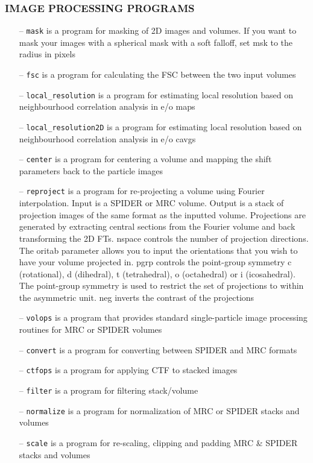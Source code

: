 \documentclass[a4paper,11pt]{article}
\newcommand{\prgname}[1]{\textcolor{NavyBlue}{\texttt{#1}}}
\begin{document}
\subsubsection{IMAGE PROCESSING PROGRAMS}
\begin{itemize}
\item[--] \prgname{mask} is a program for masking of 2D images and volumes. If you want to mask your images with a spherical mask with a soft  falloff, set msk to the radius in pixels
\item[--] \prgname{fsc} is a program for calculating the FSC between the two input volumes
\item[--] \prgname{local\_resolution} is a program for estimating local resolution based on neighbourhood correlation analysis in e/o maps
\item[--] \prgname{local\_resolution2D} is a program for estimating local resolution based on neighbourhood correlation analysis in e/o cavgs
\item[--] \prgname{center} is a program for centering a volume and mapping the shift parameters back to the particle images
\item[--] \prgname{reproject} is a program for re-projecting a volume using Fourier interpolation. Input is a SPIDER or MRC volume. Output is a stack of projection images of the same format as the inputted volume. Projections are generated by extracting central sections from the Fourier volume and back transforming the 2D FTs. nspace controls the number of projection directions. The  oritab parameter allows you to input the orientations that you wish to have your volume projected in. pgrp controls the point-group symmetry c (rotational), d (dihedral), t (tetrahedral), o (octahedral) or i (icosahedral). The point-group symmetry is used to restrict the set of projections to within the asymmetric unit. neg inverts the contrast of the projections
\item[--] \prgname{volops} is a program that provides standard single-particle image processing routines for MRC or SPIDER volumes
\item[--] \prgname{convert} is a program for converting between SPIDER and MRC formats
\item[--] \prgname{ctfops} is a program for applying CTF to stacked images
\item[--] \prgname{filter} is a program for filtering stack/volume
\item[--] \prgname{normalize} is a program for normalization of MRC or SPIDER stacks and volumes
\item[--] \prgname{scale} is a program for re-scaling, clipping and padding MRC \& SPIDER stacks and volumes

\end{itemize}
\end{document}
